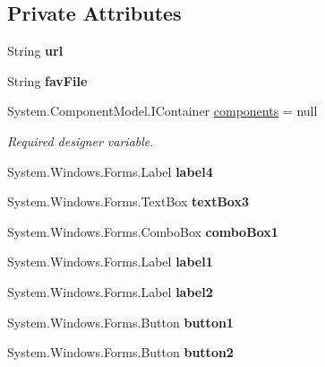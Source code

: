 \subsection*{Private Attributes}
\begin{DoxyCompactItemize}
\item 
\mbox{\label{class_windows_forms_app2_1_1_ulubione_a158b914356a9d15c8ac45b9b69bed893}} 
String {\bfseries url}
\item 
\mbox{\label{class_windows_forms_app2_1_1_ulubione_af924795e2bcc3921f678cba068ce5d31}} 
String {\bfseries fav\+File}
\item 
System.\+Component\+Model.\+I\+Container \hyperlink{class_windows_forms_app2_1_1_ulubione_a87e8bd4b55cd5b901060d298a6519aaa}{components} = null
\begin{DoxyCompactList}\small\item\em Required designer variable. \end{DoxyCompactList}\item 
\mbox{\label{class_windows_forms_app2_1_1_ulubione_a8be88683b66aa181b4bf4c353cc95c74}} 
System.\+Windows.\+Forms.\+Label {\bfseries label4}
\item 
\mbox{\label{class_windows_forms_app2_1_1_ulubione_a28b7e74e07ba7909f6eab3a7884cd2ad}} 
System.\+Windows.\+Forms.\+Text\+Box {\bfseries text\+Box3}
\item 
\mbox{\label{class_windows_forms_app2_1_1_ulubione_aaba3754d784a966aced4b4688ef68bf8}} 
System.\+Windows.\+Forms.\+Combo\+Box {\bfseries combo\+Box1}
\item 
\mbox{\label{class_windows_forms_app2_1_1_ulubione_ab15f5c3911cbb6ea66632c42d06f2224}} 
System.\+Windows.\+Forms.\+Label {\bfseries label1}
\item 
\mbox{\label{class_windows_forms_app2_1_1_ulubione_a502ea947bd41becb29f8c8e9bca30d4b}} 
System.\+Windows.\+Forms.\+Label {\bfseries label2}
\item 
\mbox{\label{class_windows_forms_app2_1_1_ulubione_aa87978fd372bd19b7a77beddc07505cb}} 
System.\+Windows.\+Forms.\+Button {\bfseries button1}
\item 
\mbox{\label{class_windows_forms_app2_1_1_ulubione_a0dda3bc80411bbd5858d5a9785b9ed45}} 
System.\+Windows.\+Forms.\+Button {\bfseries button2}
\end{DoxyCompactItemize}


